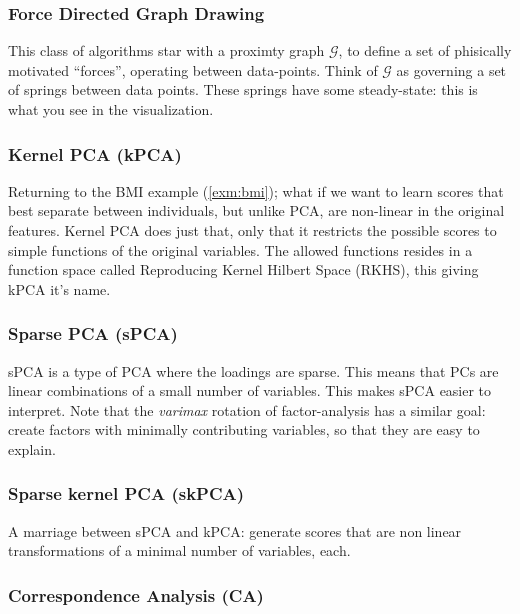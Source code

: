 \documentclass[]{book}
\theoremstyle{definition}
\theoremstyle{definition}
\theoremstyle{definition}
\theoremstyle{remark}
\begin{document}
\subsubsection{Force Directed Graph
Drawing}\label{force-directed-graph-drawing}

This class of algorithms star with a proximty graph \(\mathcal{G}\), to
define a set of phisically motivated ``forces'', operating between
data-points. Think of \(\mathcal{G}\) as governing a set of springs
between data points. These springs have some steady-state: this is what
you see in the visualization.

\subsubsection{Kernel PCA (kPCA)}\label{kernel-pca-kpca}

Returning to the BMI example (\ref{exm:bmi}); what if we want to learn
scores that best separate between individuals, but unlike PCA, are
non-linear in the original features. Kernel PCA does just that, only
that it restricts the possible scores to simple functions of the
original variables. The allowed functions resides in a function space
called Reproducing Kernel Hilbert Space (RKHS), this giving kPCA it's
name.

\subsubsection{Sparse PCA (sPCA)}\label{sparse-pca-spca}

sPCA is a type of PCA where the loadings are sparse. This means that PCs
are linear combinations of a small number of variables. This makes sPCA
easier to interpret. Note that the \emph{varimax} rotation of
factor-analysis has a similar goal: create factors with minimally
contributing variables, so that they are easy to explain.

\subsubsection{Sparse kernel PCA (skPCA)}\label{sparse-kernel-pca-skpca}

A marriage between sPCA and kPCA: generate scores that are non linear
transformations of a minimal number of variables, each.

\subsubsection{Correspondence Analysis
(CA)}\label{correspondence-analysis-ca}
\end{document}
